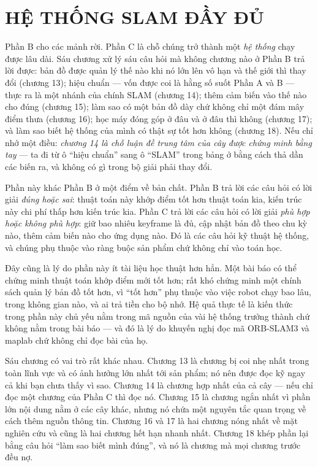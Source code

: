 \documentclass[../vslam.tex]{subfiles}
\begin{document}
\part{HỆ THỐNG SLAM ĐẦY ĐỦ}
\begin{tomtat}
Phần B cho các mảnh rời. Phần C là chỗ chúng trở thành một \emph{hệ thống} chạy được lâu dài. Sáu chương xử lý sáu câu hỏi mà không chương nào ở Phần B trả lời được: bản đồ được quản lý thế nào khi nó lớn lên vô hạn và thế giới thì thay đổi (chương 13); hiệu chuẩn --- vốn được coi là hằng số suốt Phần A và B --- thực ra là một nhánh của chính SLAM (chương 14); thêm cảm biến vào thế nào cho đúng (chương 15); làm sao có một bản đồ dày chứ không chỉ một đám mây điểm thưa (chương 16); học máy đóng góp ở đâu và ở đâu thì không (chương 17); và làm sao biết hệ thống của mình có thật sự tốt hơn không (chương 18). Nếu chỉ nhớ một điều: \emph{chương 14 là chỗ luận đề trung tâm của cây được chứng minh bằng tay} --- ta đi từ ô ``hiệu chuẩn'' sang ô ``SLAM'' trong bảng ở  bằng cách thả dần các biến ra, và không có gì trong bộ giải phải thay đổi.
\end{tomtat}

Phần này khác Phần B ở một điểm về bản chất. Phần B trả lời các câu hỏi có lời giải \emph{đúng hoặc sai}: thuật toán này khớp điểm tốt hơn thuật toán kia, kiến trúc này chi phí thấp hơn kiến trúc kia. Phần C trả lời các câu hỏi có lời giải \emph{phù hợp hoặc không phù hợp}: giữ bao nhiêu keyframe là đủ, cập nhật bản đồ theo chu kỳ nào, thêm cảm biến nào cho ứng dụng nào. Đó là các câu hỏi kỹ thuật hệ thống, và chúng phụ thuộc vào ràng buộc sản phẩm chứ không chỉ vào toán học.

Đây cũng là lý do phần này ít tài liệu học thuật hơn hẳn. Một bài báo có thể chứng minh thuật toán khớp điểm mới tốt hơn; rất khó chứng minh một chính sách quản lý bản đồ tốt hơn, vì ``tốt hơn'' phụ thuộc vào việc robot chạy bao lâu, trong không gian nào, và ai trả tiền cho bộ nhớ. Hệ quả thực tế là kiến thức trong phần này chủ yếu nằm trong mã nguồn của vài hệ thống trưởng thành chứ không nằm trong bài báo --- và đó là lý do  khuyến nghị đọc mã ORB-SLAM3 và maplab chứ không chỉ đọc bài của họ.

Sáu chương có vai trò rất khác nhau. Chương 13 là chương bị coi nhẹ nhất trong toàn lĩnh vực và có ảnh hưởng lớn nhất tới sản phẩm; nó nên được đọc kỹ ngay cả khi bạn chưa thấy vì sao. Chương 14 là chương hợp nhất của cả cây --- nếu chỉ đọc một chương của Phần C thì đọc nó. Chương 15 là chương ngắn nhất vì phần lớn nội dung nằm ở các cây khác, nhưng nó chứa một nguyên tắc quan trọng về cách thêm nguồn thông tin. Chương 16 và 17 là hai chương nóng nhất về mặt nghiên cứu và cũng là hai chương hết hạn nhanh nhất. Chương 18 khép phần lại bằng câu hỏi ``làm sao biết mình đúng'', và nó là chương mà mọi chương trước đều nợ.







\ifSubfilesClassLoaded{\printbibliography[title={Nguồn}]}{}
\end{document}
